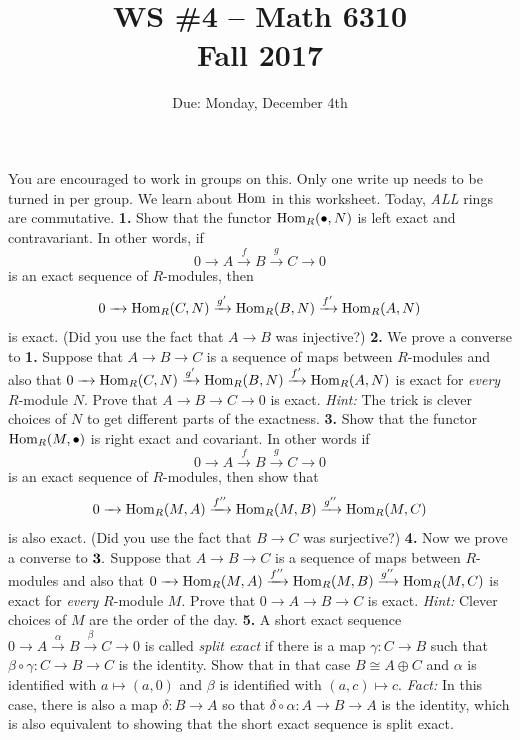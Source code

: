 \documentclass[11pt]{amsart}
\theoremstyle{theorem}
\renewcommand{\to}[1][]{\xrightarrow{\ #1\ }}
\newcommand{\Hom}{\textnormal{Hom}}
\begin{document}
\title{WS \#4 -- Math 6310\\Fall 2017}
\author{Due: Monday, December 4th}
\maketitle

You are encouraged to work in groups on this.  Only one write up needs to be turned in per group.  We learn about $\Hom$ in this worksheet.  Today, \emph{ALL} rings are commutative.
\vskip 6pt
\noindent
{\bf 1.}  Show that the functor $\Hom_R(\bullet, N)$ is left exact and contravariant.  In other words, if
\[
0 \to A \xrightarrow{f} B \xrightarrow{g} C \to 0
\]
is an exact sequence of $R$-modules, then
\[
0 \to \Hom_R(C, N) \xrightarrow{g'} \Hom_R(B, N) \xrightarrow{f'} \Hom_R(A, N)
\]
is exact.  (Did you use the fact that $A \to B$ was injective?)
\newpage
\noindent
{\bf 2.}  We prove a converse to {\bf 1.}   Suppose that $A \to B \to C$ is a sequence of maps between $R$-modules and also that $0 \to \Hom_R(C, N) \xrightarrow{g'} \Hom_R(B, N) \xrightarrow{f'} \Hom_R(A, N)$ is exact for \emph{every} $R$-module $N$.  Prove that $A \to B \to C \to 0$ is exact.
\vskip 3pt
\emph{Hint:} The trick is clever choices of $N$ to get different parts of the exactness.
\vskip 250pt
\noindent
{\bf 3.}  Show that the functor $\Hom_R(M, \bullet)$ is right exact and covariant.  In other words if
\[
0 \to A \xrightarrow{f} B \xrightarrow{g} C \to 0
\]
is an exact sequence of $R$-modules, then show that
\[
0 \to \Hom_R(M, A) \xrightarrow{f''} \Hom_R(M, B) \xrightarrow{g''} \Hom_R(M, C)
\]
is also exact.  (Did you use the fact that $B \to C$ was surjective?)
\newpage
\noindent
{\bf 4.}  Now we prove a converse to ${\bf 3.}$   Suppose that $A \to B \to C$ is a sequence of maps between $R$-modules and also that $0 \to \Hom_R(M, A) \xrightarrow{f''} \Hom_R(M, B) \xrightarrow{g''} \Hom_R(M, C)$ is exact for \emph{every} $R$-module $M$.  Prove that $0 \to A \to B \to C$ is exact.
\vskip 3pt
\emph{Hint:} Clever choices of $M$ are the order of the day.
\vskip 250pt
{\bf 5.}  A short exact sequence $0 \to A \xrightarrow{\alpha} B \xrightarrow{\beta} C \to 0$ is called \emph{split exact} if there is a map $\gamma : C \to B$ such that $\beta \circ \gamma : C \to B \to C$ is the identity.  Show that in that case $B \cong A \oplus C$ and $\alpha$ is identified with $a \mapsto (a, 0)$ and $\beta$ is identified with $(a,c) \mapsto c$.
\vskip 3pt
\emph{Fact:} In this case, there is also a map $\delta : B \to A$ so that $\delta \circ \alpha : A \to B \to A$ is the identity, which is also equivalent to showing that the short exact sequence is split exact.
\end{document}
